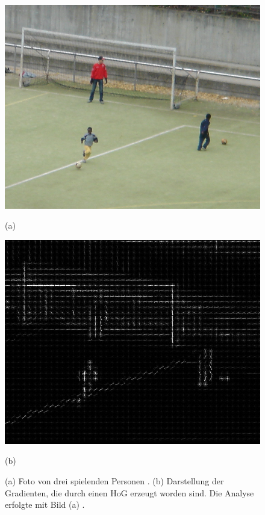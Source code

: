 
\begin{figure}[H]
	\centering
	\begin{minipage}[b]{0.45\textwidth}
		\includegraphics[width=\textwidth]{Bilder/hog1crop.png}
		\caption{(a)}
	\end{minipage}
	\hfill
	\begin{minipage}[b]{0.45\textwidth}
		\includegraphics[width=\textwidth]{Bilder/hog2crop.jpg}
		\caption{(b)}
	\end{minipage}
	\caption{(a) Foto von drei spielenden Personen \cite{inria1}. (b) Darstellung der Gradienten, die durch einen HoG erzeugt worden sind. Die Analyse erfolgte mit Bild (a) \cite{inria1}.}
	\label{fiq: hog}
\end{figure}